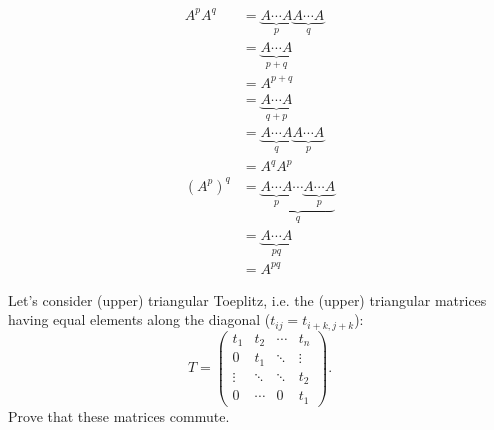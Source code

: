 \begin{solution}
  \begin{align*}
    A^pA^q
    & = \underbrace{A \cdots A}_{p} \underbrace{A \cdots A}_{q}\\
    & = \underbrace{A \cdots A}_{p+q}\\
    & = A^{p+q}\\
    & = \underbrace{A \cdots A}_{q+p}\\
    & = \underbrace{A \cdots A}_{q} \underbrace{A \cdots A}_{p}\\
    & = A^qA^p\\
    (A^p)^q
    & = \underbrace{\underbrace{A \cdots A}_{p} \cdots \underbrace{A \cdots A}_{p}}_q\\
    & = \underbrace{A \cdots A}_{pq}\\
    & = A^{pq}
  \end{align*}
\end{solution}

Let's consider (upper) triangular Toeplitz,
i.e. the (upper) triangular matrices having equal elements
 along the diagonal ($t_{ij} = t_{i+k,j+k}$):
\[
  T =
  \begin{pmatrix}
    t_1 & t_2 & \cdots & t_n\\
    0   & t_1 & \ddots & \vdots\\
    \vdots & \ddots & \ddots & t_2\\
    0 & \cdots & 0 & t_1
  \end{pmatrix}.
\]
Prove that these matrices commute.


